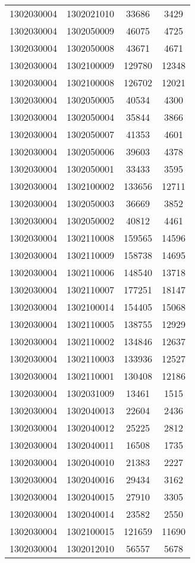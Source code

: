 \begin{longtable}[h]{llcc}
		1302030004 & 1302021010 & 33686 & 3429\\
		1302030004 & 1302050009 & 46075 & 4725\\
		1302030004 & 1302050008 & 43671 & 4671\\
		1302030004 & 1302100009 & 129780 & 12348\\
		1302030004 & 1302100008 & 126702 & 12021\\
		1302030004 & 1302050005 & 40534 & 4300\\
		1302030004 & 1302050004 & 35844 & 3866\\
		1302030004 & 1302050007 & 41353 & 4601\\
		1302030004 & 1302050006 & 39603 & 4378\\
		1302030004 & 1302050001 & 33433 & 3595\\
		1302030004 & 1302100002 & 133656 & 12711\\
		1302030004 & 1302050003 & 36669 & 3852\\
		1302030004 & 1302050002 & 40812 & 4461\\
		1302030004 & 1302110008 & 159565 & 14596\\
		1302030004 & 1302110009 & 158738 & 14695\\
		1302030004 & 1302110006 & 148540 & 13718\\
		1302030004 & 1302110007 & 177251 & 18147\\
		1302030004 & 1302100014 & 154405 & 15068\\
		1302030004 & 1302110005 & 138755 & 12929\\
		1302030004 & 1302110002 & 134846 & 12637\\
		1302030004 & 1302110003 & 133936 & 12527\\
		1302030004 & 1302110001 & 130408 & 12186\\
		1302030004 & 1302031009 & 13461 & 1515\\
		1302030004 & 1302040013 & 22604 & 2436\\
		1302030004 & 1302040012 & 25225 & 2812\\
		1302030004 & 1302040011 & 16508 & 1735\\
		1302030004 & 1302040010 & 21383 & 2227\\
		1302030004 & 1302040016 & 29434 & 3162\\
		1302030004 & 1302040015 & 27910 & 3305\\
		1302030004 & 1302040014 & 23582 & 2550\\
		1302030004 & 1302100015 & 121659 & 11690\\
		1302030004 & 1302012010 & 56557 & 5678\\

\end{longtable}
